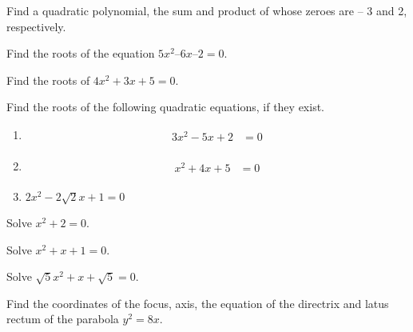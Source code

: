 \item Find a quadratic polynomial, the sum and product of whose zeroes are – 3 and 2, respectively.
\\
\solution

%
\item Find the roots of the equation $5x^2  – 6x – 2 = 0 $.
\item Find the roots of $4x^2 + 3x + 5 = 0 $.
\item Find the roots of the following quadratic equations, if they exist.
\begin{enumerate}
    \item
    \begin{align}
    \begin{split}
    3x^2-5x+2&=0 \label{quad/2/23/1.0.1}
    \end{split}
    \end{align}
    \item
    \begin{align}
    \begin{split}
    x^2+4x+5&=0 \label{quad/2/23/1.0.2}
    \end{split}
    \end{align}
    \item 	$2x^2-2\sqrt{2}x+1 = 0$
\end{enumerate}
%
\solution
\begin{enumerate}

\end{enumerate}

\item Solve $x^2+ 2 = 0 $.
\\
\solution

\item Solve $x^2+ x+1 = 0 $.
\item Solve $\sqrt{5}x^2+ x+\sqrt{5} = 0 $.
%
\\
\solution



\item Find the coordinates of the focus, axis, the equation of the directrix and latus rectum of the parabola $y^2 = 8x$.
%

